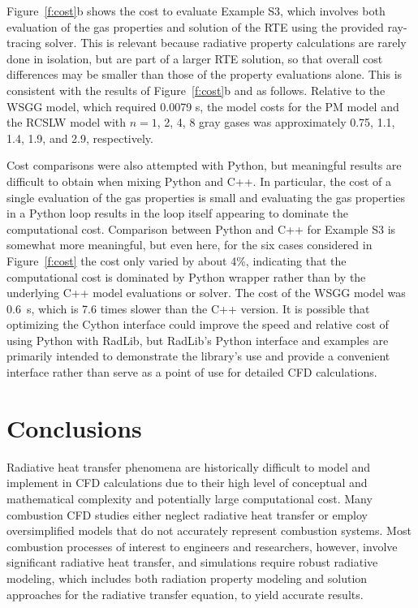 \documentclass[preprint,12pt]{elsarticle}
\begin{document}
Figure~\ref{f:cost}b shows the cost to evaluate Example S3, which involves both evaluation of the gas properties and solution of the RTE using the provided ray-tracing solver. This is relevant because radiative property calculations are rarely done in isolation, but are part of a larger RTE solution, so that overall cost differences may be smaller than those of the property evaluations alone. This is consistent with the results of Figure~\ref{f:cost}b and as follows. Relative to the WSGG model, which required 0.0079 s, the model costs for the PM model and the RCSLW model with $n=1$, 2, 4, 8 gray gases was approximately 0.75, 1.1, 1.4, 1.9, and 2.9, respectively.

Cost comparisons were also attempted with Python, but meaningful results are difficult to obtain when mixing Python and C++. In particular, the cost of a single evaluation of the gas properties is small and evaluating the gas properties in a Python loop results in the loop itself appearing to dominate the computational cost. Comparison between Python and C++ for Example S3 is somewhat more meaningful, but even here, for the six cases considered in Figure~\ref{f:cost} the cost only varied by about 4\%, indicating that the computational cost is dominated by Python wrapper rather than by the underlying C++ model evaluations or solver. The cost of the WSGG model was 0.6~s, which is 7.6 times slower than the C++ version. It is possible that optimizing the Cython interface could improve the speed and relative cost of using Python with RadLib, but RadLib's Python interface and examples are primarily intended to demonstrate the library's use and provide a convenient interface rather than serve as a point of use for detailed CFD calculations.



\section{Conclusions} \label{s:conclusions}

Radiative heat transfer phenomena are historically difficult to model and implement in CFD calculations due to their high level of conceptual and mathematical complexity and potentially large computational cost. Many combustion CFD studies either neglect radiative heat transfer or employ oversimplified models that do not accurately represent combustion systems. Most combustion processes of interest to engineers and researchers, however, involve significant radiative heat transfer, and simulations require robust radiative modeling, which includes both radiation property modeling and solution approaches for the radiative transfer equation, to yield accurate results.
\end{document}
